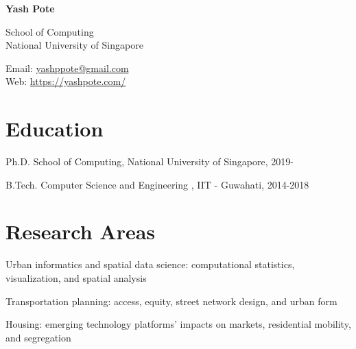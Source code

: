 \documentclass[12pt,letterpaper]{report}
\newcommand{\myname}{Yash Pote}
\newcommand{\namefont}[1]{{\normalfont\bfseries\Huge{#1}}}
\newcommand{\listitemspace}{0.15em}
\renewenvironment{itemize}
{\begin{list}{}{\setlength{\leftmargin}{0em}
            \setlength{\parskip}{0em}
            \setlength{\itemsep}{\listitemspace}
            \setlength{\parsep}{\listitemspace}}}
    {\end{list}}
\begin{document}
    \raggedright

    \namefont{\myname}

    \vspace{1em}
    \begin{minipage}[t]{0.68\textwidth}
        School of Computing \\
		National University of Singapore
    \end{minipage}
    \begin{minipage}[t]{0.31\textwidth}
        Email: \href{mailto:yashppote@gmail.com}{yashppote@gmail.com} \\
        Web: \href{https://yashpote.com/}{https://yashpote.com/}
    \end{minipage}
    \vspace{0.5em}



    \section*{Education}

    \begin{tablist}

        \item[Ph.D.] \tab School of Computing, National University of Singapore, 2019-

        \item[B.Tech.]  \tab Computer Science and Engineering , IIT - Guwahati, 2014-2018

    \end{tablist}


    \section*{Research Areas}

    \begin{itemize}

        \item Urban informatics and spatial data science: computational statistics, visualization, and spatial analysis

        \item Transportation planning: access, equity, street network design, and urban form

        \item Housing: emerging technology platforms' impacts on markets, residential mobility, and segregation

    \end{itemize}
\end{document}
